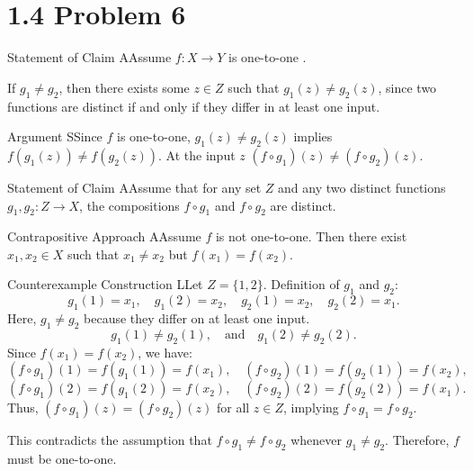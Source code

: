 \documentclass{report}
\begin{document}
\section*{1.4 Problem 6}


\begin{ClaimWithMagnolia}{Statement of Claim}
    AAssume $f: X \to Y$ is one-to-one .
\end{ClaimWithMagnolia}

\begin{keyideaWithLotus}
    If $g_1 \neq g_2$, then there exists some $z \in Z$ such that $g_1(z) \neq g_2(z)$, since two functions are distinct if and only if they differ in at least one input.
\end{keyideaWithLotus}

\begin{RemarkWithLily}{Argument}
    SSince $f$ is one-to-one, $g_1(z) \neq g_2(z)$ implies $f(g_1(z)) \neq f(g_2(z))$. At the input $z$ $(f \circ g_1)(z) \neq (f \circ g_2)(z)$. 
\end{RemarkWithLily}

\begin{ClaimWithMagnolia}{Statement of Claim}
    AAssume that for any set $Z$ and any two distinct functions $g_1, g_2: Z \to X$, the compositions $f \circ g_1$ and $f \circ g_2$ are distinct. 
\end{ClaimWithMagnolia}

\begin{ContrapositiveWithLycoris}{Contrapositive Approach}
    AAssume $f$ is not one-to-one. Then there exist $x_1, x_2 \in X$ such that $x_1 \neq x_2$ but $f(x_1) = f(x_2)$. 
\end{ContrapositiveWithLycoris}
    
\begin{RemarkWithLily}{Counterexample Construction}
    LLet $Z = \{1, 2\}$. Definition of $g_1$ and $g_2$:
    \[
    g_1(1) = x_1, \quad g_1(2) = x_2, \quad g_2(1) = x_2, \quad g_2(2) = x_1.
    \]
    Here, $g_1 \neq g_2$ because they differ on at least one input.
    \[
    g_1(1) \neq g_2(1), \quad \text{and} \quad g_1(2) \neq g_2(2).
    \]
    Since $f(x_1) = f(x_2)$, we have:
    \[
    (f \circ g_1)(1) = f(g_1(1)) = f(x_1), \quad (f \circ g_2)(1) = f(g_2(1)) = f(x_2),
    \]
    \[
    (f \circ g_1)(2) = f(g_1(2)) = f(x_2), \quad (f \circ g_2)(2) = f(g_2(2)) = f(x_1).
    \]
    Thus, $(f \circ g_1)(z) = (f \circ g_2)(z)$ for all $z \in Z$, implying $f \circ g_1 = f \circ g_2$.

    This contradicts the assumption that $f \circ g_1 \neq f \circ g_2$ whenever $g_1 \neq g_2$. Therefore, $f$ must be one-to-one.
\end{RemarkWithLily}
\end{document}
